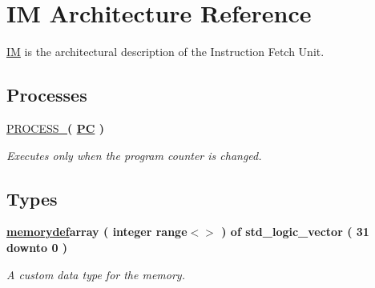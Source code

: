 \hypertarget{class_i_f_unit_1_1_i_m}{\section{I\-M Architecture Reference}
\label{class_i_f_unit_1_1_i_m}
}


\hyperlink{class_i_f_unit_1_1_i_m}{I\-M} is the architectural description of the Instruction Fetch Unit.  


\subsection*{Processes}
 \begin{DoxyCompactItemize}
\item 
\hypertarget{class_i_f_unit_1_1_i_m_ac0b0aa4171471237152f7258fc6cd4ac}{\hyperlink{class_i_f_unit_1_1_i_m_ac0b0aa4171471237152f7258fc6cd4ac}{P\-R\-O\-C\-E\-S\-S\-\_}{\bfseries  ( {\bfseries {\bfseries \hyperlink{class_i_f_unit_a15b73a10b7d4cf16cdae7729404b05da}{P\-C}} \textcolor{vhdlchar}{ }\textcolor{vhdlchar}{ }} )}}\label{class_i_f_unit_1_1_i_m_ac0b0aa4171471237152f7258fc6cd4ac}

\begin{DoxyCompactList}\small\item\em Executes only when the program counter is changed. \end{DoxyCompactList}\end{DoxyCompactItemize}
\subsection*{Types}
 \begin{DoxyCompactItemize}
\item 
\hypertarget{class_i_f_unit_1_1_i_m_a49bac0fe5abc88bc74320eabd2613b1f}{{\bfseries \hyperlink{class_i_f_unit_1_1_i_m_a49bac0fe5abc88bc74320eabd2613b1f}{memorydef}{\bfseries \textcolor{vhdlkeyword}{array}\textcolor{vhdlchar}{ }\textcolor{vhdlchar}{(}\textcolor{vhdlchar}{ }\textcolor{vhdlchar}{ }\textcolor{comment}{integer}\textcolor{vhdlchar}{ }\textcolor{vhdlchar}{range$<$$>$}\textcolor{vhdlchar}{ }\textcolor{vhdlchar}{ }\textcolor{vhdlchar}{ }\textcolor{vhdlchar}{)}\textcolor{vhdlchar}{ }\textcolor{vhdlchar}{ }\textcolor{vhdlkeyword}{of}\textcolor{vhdlchar}{ }\textcolor{comment}{std\-\_\-logic\-\_\-vector}\textcolor{vhdlchar}{ }\textcolor{vhdlchar}{(}\textcolor{vhdlchar}{ } \textcolor{vhdldigit}{31} \textcolor{vhdlchar}{ }\textcolor{vhdlchar}{ }\textcolor{vhdlchar}{ }\textcolor{vhdlkeyword}{downto}\textcolor{vhdlchar}{ }\textcolor{vhdlchar}{ }\textcolor{vhdlchar}{ } \textcolor{vhdldigit}{0} \textcolor{vhdlchar}{ }\textcolor{vhdlchar}{)}\textcolor{vhdlchar}{ }}} }\label{class_i_f_unit_1_1_i_m_a49bac0fe5abc88bc74320eabd2613b1f}

\begin{DoxyCompactList}\small\item\em A custom data type for the memory. \end{DoxyCompactList}\end{DoxyCompactItemize}
